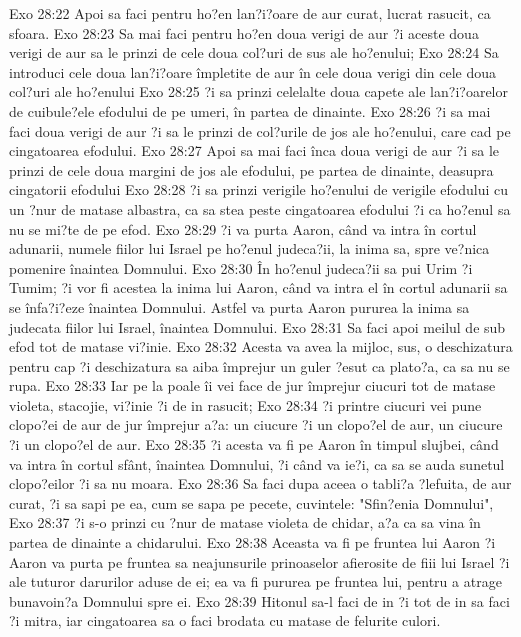 Exo 28:22  Apoi sa faci pentru ho?en lan?i?oare de aur curat, lucrat rasucit, ca sfoara.
Exo 28:23  Sa mai faci pentru ho?en doua verigi de aur ?i aceste doua verigi de aur sa le prinzi de cele doua col?uri de sus ale ho?enului;
Exo 28:24  Sa introduci cele doua lan?i?oare împletite de aur în cele doua verigi din cele doua col?uri ale ho?enului
Exo 28:25  ?i sa prinzi celelalte doua capete ale lan?i?oarelor de cuibule?ele efodului de pe umeri, în partea de dinainte.
Exo 28:26  ?i sa mai faci doua verigi de aur ?i sa le prinzi de col?urile de jos ale ho?enului, care cad pe cingatoarea efodului.
Exo 28:27  Apoi sa mai faci înca doua verigi de aur ?i sa le prinzi de cele doua margini de jos ale efodului, pe partea de dinainte, deasupra cingatorii efodului
Exo 28:28  ?i sa prinzi verigile ho?enului de verigile efodului cu un ?nur de matase albastra, ca sa stea peste cingatoarea efodului ?i ca ho?enul sa nu se mi?te de pe efod.
Exo 28:29  ?i va purta Aaron, când va intra în cortul adunarii, numele fiilor lui Israel pe ho?enul judeca?ii, la inima sa, spre ve?nica pomenire înaintea Domnului.
Exo 28:30  În ho?enul judeca?ii sa pui Urim ?i Tumim; ?i vor fi acestea la inima lui Aaron, când va intra el în cortul adunarii sa se înfa?i?eze înaintea Domnului. Astfel va purta Aaron pururea la inima sa judecata fiilor lui Israel, înaintea Domnului.
Exo 28:31  Sa faci apoi meilul de sub efod tot de matase vi?inie.
Exo 28:32  Acesta va avea la mijloc, sus, o deschizatura pentru cap ?i deschizatura sa aiba împrejur un guler ?esut ca plato?a, ca sa nu se rupa.
Exo 28:33  Iar pe la poale îi vei face de jur împrejur ciucuri tot de matase violeta, stacojie, vi?inie ?i de in rasucit;
Exo 28:34  ?i printre ciucuri vei pune clopo?ei de aur de jur împrejur a?a: un ciucure ?i un clopo?el de aur, un ciucure ?i un clopo?el de aur.
Exo 28:35  ?i acesta va fi pe Aaron în timpul slujbei, când va intra în cortul sfânt, înaintea Domnului, ?i când va ie?i, ca sa se auda sunetul clopo?eilor ?i sa nu moara.
Exo 28:36  Sa faci dupa aceea o tabli?a ?lefuita, de aur curat, ?i sa sapi pe ea, cum se sapa pe pecete, cuvintele: "Sfin?enia Domnului",
Exo 28:37  ?i s-o prinzi cu ?nur de matase violeta de chidar, a?a ca sa vina în partea de dinainte a chidarului.
Exo 28:38  Aceasta va fi pe fruntea lui Aaron ?i Aaron va purta pe fruntea sa neajunsurile prinoaselor afierosite de fiii lui Israel ?i ale tuturor darurilor aduse de ei; ea va fi pururea pe fruntea lui, pentru a atrage bunavoin?a Domnului spre ei.
Exo 28:39  Hitonul sa-l faci de in ?i tot de in sa faci ?i mitra, iar cingatoarea sa o faci brodata cu matase de felurite culori.
